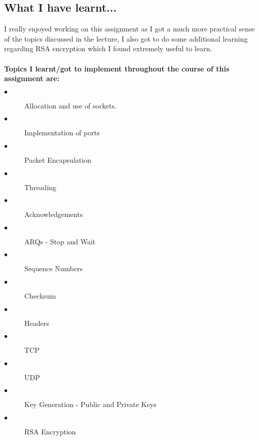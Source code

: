 \documentclass[10pt]{article}
\begin{document}
	\subsection{What I have learnt...}
	I really enjoyed working on this assignment as I got a much more practical sense of the topics discussed in the lecture, I also got to do some additional learning regarding RSA encryption which I found extremely useful to learn.\\\\\textbf{Topics I learnt/got to implement throughout the course of this assignment are:}
			\begin{description}
		\item[$\bullet$ ] Allocation and use of sockets.
		\item[$\bullet$ ] Implementation of ports
		\item[$\bullet$ ] Packet Encapsulation
		\item[$\bullet$ ] Threading
		\item[$\bullet$ ] Acknowledgements
		\item[$\bullet$ ] ARQs - Stop and Wait
		\item[$\bullet$ ] Sequence Numbers
		\item[$\bullet$ ] Checksum
		\item[$\bullet$ ] Headers
		\item[$\bullet$ ] TCP
		\item[$\bullet$ ] UDP
		\item[$\bullet$ ] Key Generation - Public and Private Keys
		\item[$\bullet$ ] RSA Encryption
	\end{description}
\end{document}

